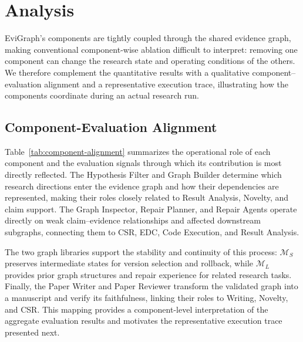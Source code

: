 \documentclass[letterpaper]{article} %
\begin{document}
\section{Analysis}

\label{sec:discussion}

EviGraph's components are tightly coupled through the shared evidence graph,
making conventional component-wise ablation difficult to interpret: removing
one component can change the research state and operating conditions of the
others. We therefore complement the quantitative results with a qualitative
component--evaluation alignment and a representative execution trace,
illustrating how the components coordinate during an actual research run.

\subsection{Component-Evaluation Alignment}
\label{sec:component-alignment}

Table~\ref{tab:component-alignment} summarizes the operational role of each
component and the evaluation signals through which its contribution is most
directly reflected. The Hypothesis Filter and Graph Builder determine which research directions enter the evidence graph and how their dependencies are represented, making their roles closely related to Result Analysis, Novelty, and claim support. The Graph Inspector, Repair Planner, and Repair Agents operate directly on weak claim--evidence relationships and affected downstream subgraphs, connecting them to CSR, EDC, Code Execution, and Result Analysis.

The two graph libraries support the stability and continuity of this process: $\mathcal{M}_S$ preserves intermediate states for version selection and rollback, while $\mathcal{M}_L$ provides prior graph structures and repair experience for related research tasks. Finally, the Paper Writer and Paper Reviewer transform the validated graph into a manuscript and verify its faithfulness, linking their roles to Writing, Novelty, and CSR. This mapping provides a component-level interpretation of the aggregate evaluation results and motivates the representative execution trace presented next.
\end{document}
